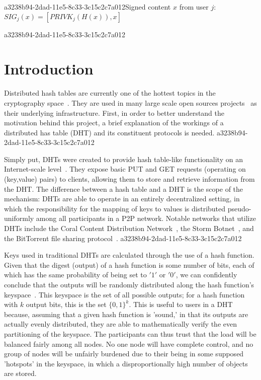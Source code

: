 \documentclass[12pt]{article}
\begin{document}
a3238b94-2dad-11e5-8c33-3c15c2c7a012Signed content $x$ from user $j$: $SIG_j(x) = \left[ PRIVK_j( H(x) ), x \right]$

a3238b94-2dad-11e5-8c33-3c15c2c7a012\section{Introduction}
\par Distributed hash tables are currently one of the hottest topics in the cryptography space~\cite{Stoica:2001dj,Rowstron:2001ea,Ratnasamy:2001wn}. They are used in many large scale open sources projects~\cite{Freitas:2013tb,Xu:2010vs,Perfitt:2010fh} as their underlying infrastructure. First, in order to better understand the motivation behind this project, a brief explanation of the workings of a distributed has table (DHT) and its constituent protocols is needed.
a3238b94-2dad-11e5-8c33-3c15c2c7a012
\par Simply put, DHTs were created to provide hash table-like functionality on an Internet-scale level~\cite{Ratnasamy:2001wn}. They expose basic PUT and GET requests (operating on (key,value) pairs) to clients, allowing them to store and retrieve information from the DHT. The difference between a hash table and a DHT is the scope of the mechanism: DHTs are able to operate in an entirely decentralized setting, in which the responsibility for the mapping of keys to values is distributed pseudo-uniformly among all participants in a P2P network. Notable networks that utilize DHTs include the Coral Content Distribution Network~\cite{Freedman:2004vb}, the Storm Botnet~\cite{Holz:2008uk}, and the BitTorrent file sharing protocol~\cite{Cohen:y1_8mBnw}.
a3238b94-2dad-11e5-8c33-3c15c2c7a012
\par Keys used in traditional DHTs are calculated through the use of a hash function. Given that the digest (output) of a hash function is some number of bits, each of which has the same probability of being set to $'1'$ or $'0'$, we can confidently conclude that the outputs will be randomly distributed along the hash function's keyspace~. This keyspace is the set of all possible outputs; for a hash function with $k$ output bits, this is the set $\{0,1\}^k$. This is useful to users in a DHT because, assuming that a given hash function is 'sound,' in that its outputs are actually evenly distributed, they are able to mathematically verify the even partitioning of the keyspace. The participants can thus trust that the load will be balanced fairly among all nodes. No one node will have complete control, and no group of nodes will be unfairly burdened due to their being in some supposed 'hotspots' in the keyspace, in which a disproportionally high number of objects are stored.~
\end{document}
